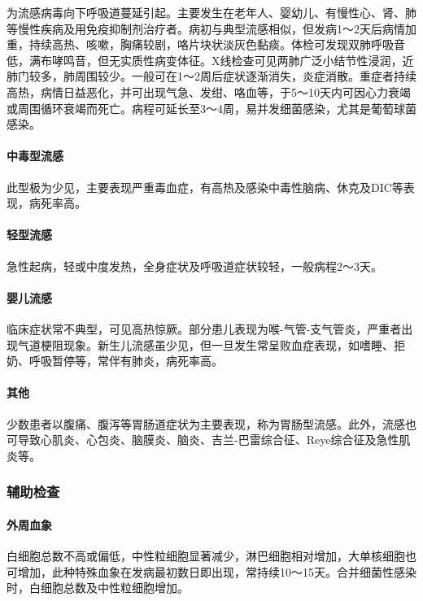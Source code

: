 为流感病毒向下呼吸道蔓延引起。主要发生在老年人、婴幼儿、有慢性心、肾、肺等慢性疾病及用免疫抑制剂治疗者。病初与典型流感相似，但发病1～2天后病情加重，持续高热、咳嗽，胸痛较剧，咯片块状淡灰色黏痰。体检可发现双肺呼吸音低，满布哮鸣音，但无实质性病变体征。X线检查可见两肺广泛小结节性浸润，近肺门较多，肺周围较少。一般可在1～2周后症状逐渐消失，炎症消散。重症者持续高热，病情日益恶化，并可出现气急、发绀、咯血等，于5～10天内可因心力衰竭或周围循环衰竭而死亡。病程可延长至3～4周，易并发细菌感染，尤其是葡萄球菌感染。

\paragraph{中毒型流感}

此型极为少见，主要表现严重毒血症，有高热及感染中毒性脑病、休克及DIC等表现，病死率高。

\paragraph{轻型流感}

急性起病，轻或中度发热，全身症状及呼吸道症状较轻，一般病程2～3天。

\paragraph{婴儿流感}

临床症状常不典型，可见高热惊厥。部分患儿表现为喉-气管-支气管炎，严重者出现气道梗阻现象。新生儿流感虽少见，但一旦发生常呈败血症表现，如嗜睡、拒奶、呼吸暂停等，常伴有肺炎，病死率高。

\paragraph{其他}

少数患者以腹痛、腹泻等胃肠道症状为主要表现，称为胃肠型流感。此外，流感也可导致心肌炎、心包炎、脑膜炎、脑炎、吉兰-巴雷综合征、Reye综合征及急性肌炎等。

\subsubsection{辅助检查}

\paragraph{外周血象}

白细胞总数不高或偏低，中性粒细胞显著减少，淋巴细胞相对增加，大单核细胞也可增加，此种特殊血象在发病最初数日即出现，常持续10～15天。合并细菌性感染时，白细胞总数及中性粒细胞增加。

